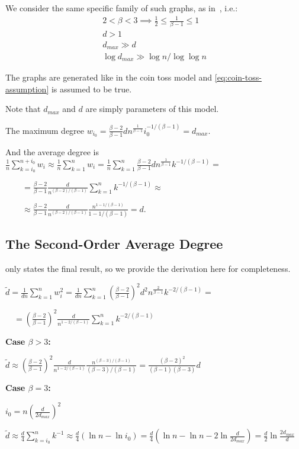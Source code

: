We consider the same specific family of such graphs, as in~\cite{cl04}, i.e.:
\begin{gather}
    2<\beta<3\implies\frac{1}{2}\leq\frac{1}{\beta-1}\leq 1\\
    d>1\\
    d_{max}\gg d\\
    \log d_{max}\gg \log n/\log\log n
\end{gather}

The graphs are generated like in the coin toss model
and \eqref{eq:coin-toss-assumption} is assumed to be true.

Note that $d_{max}$ and $d$ are simply parameters of this model.

The maximum degree $w_{i_0}=\frac{\beta-2}{\beta-1}dn^{\frac{1}{\beta-1}}i_0^{-1/(\beta-1)}=d_{max}$.

And the average degree is $\frac{1}{n}\sum_{k=i_0}^{n+i_0}{w_i}
\approx\frac{1}{n}\sum_{k=1}^{n}{w_i}
=\frac{1}{n}\sum_{k=1}^{n}{
    \frac{\beta-2}{\beta-1}dn^{\frac{1}{\beta-1}}k^{-1/(\beta-1)}
}=$

$\qquad=\frac{\beta-2}{\beta-1}\frac{d}{n^{(\beta-2)/(\beta-1)}}
\sum_{k=1}^{n}{k^{-1/(\beta-1)}}\approx$
    
$\qquad\approx\frac{\beta-2}{\beta-1}\frac{d}{n^{(\beta-2)/(\beta-1)}}
\frac{n^{1-1/(\beta-1)}}{1-1/(\beta-1)}=d$.

\subsection{The Second-Order Average Degree}

\cite{cl04} only states the final result, so we provide
the derivation here for completeness.

$\tilde{d}=\frac{1}{dn}\sum_{k=1}^{n}{w_i^2}
=\frac{1}{dn}\sum_{k=1}^{n}{
    \left(\frac{\beta-2}{\beta-1}\right)^2d^2n^{\frac{2}{\beta-1}}k^{-2/(\beta-1)}
}=$

$\quad=\left(\frac{\beta-2}{\beta-1}\right)^2\frac{d}{n^{1-2/(\beta-1)}}
\sum_{k=1}^{n}{k^{-2/(\beta-1)}}$

\textbf{Case $\beta>3$:}

$\tilde{d}\approx\left(\frac{\beta-2}{\beta-1}\right)^2\frac{d}{n^{1-2/(\beta-1)}}
\frac{n^{(\beta-3)/(\beta-1)}}{(\beta-3)/(\beta-1)}
=\frac{(\beta-2)^2}{(\beta-1)(\beta-3)}d$

\textbf{Case $\beta=3$:}

$i_0=n\left(\frac{d}{2d_{max}}\right)^2$

$\tilde{d}\approx\frac{d}{4}\sum_{k=i_0}^{n}{k^{-1}}\approx\frac{d}{4}(\ln n-\ln i_0)
=\frac{d}{4}(\ln n-\ln n-2\ln\frac{d}{2d_{max}})=\frac{d}{2}\ln\frac{2d_{max}}{d}$

